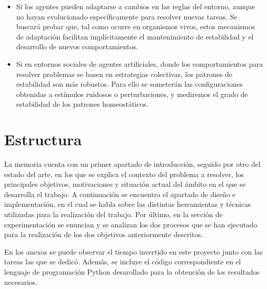 \begin{itemize}
\item Si los agentes pueden adaptarse a cambios en las reglas del entorno, aunque no hayan
evolucionado específicamente para resolver nuevas tareas. Se buscará probar que, tal
como ocurre en organismos vivos, estos mecanismos de adaptación facilitan
implícitamente el mantenimiento de estabilidad y el desarrollo de nuevos
comportamientos.
\item  Si en entornos sociales de agentes artificiales, donde los comportamientos para resolver
problemas se basen en estrategias colectivas, los patrones de estabilidad son más
robustos. Para ello se someterán las configuraciones obtenidas a estímulos ruidosos o
perturbaciones, y mediremos el grado de estabilidad de los patrones homeostáticos.
\end{itemize}

\section{Estructura}
La memoria cuenta con un primer apartado de introducción, seguido por otro del estado del arte, en los que se explica el contexto del problema a resolver, los principales objetivos,
motivaciones y situación actual del ámbito en el que se desarrolla el trabajo. A continuación se encuentra el apartado de diseño e implementación, en el cual se habla sobre las distintas
herramientas y técnicas utilizadas para la realización del trabajo. Por último, en la sección de experimentación se enuncian y se analizan los dos procesos que se han ejecutado para la
realización de los dos objetivos anteriormente descritos.

En los anexos se puede observar el tiempo invertido en este proyecto junto con las tareas las que se dedicó. Además,
se incluye el código correspondiente en el lenguaje de programación Python desarollado para la obtención de los resultados necesarios.
